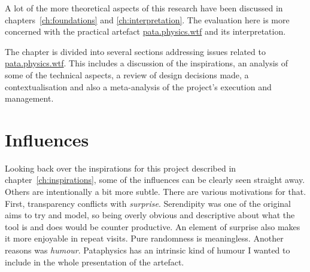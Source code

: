 \spirals

A lot of the more theoretical aspects of this research have been discussed in chapters~\ref{ch:foundations} and \ref{ch:interpretation}. The evaluation here is more concerned with the practical artefact \url{pata.physics.wtf} and its interpretation.

The chapter is divided into several sections addressing issues related to \url{pata.physics.wtf}. This includes a discussion of the inspirations, an analysis of some of the technical aspects, a review of design decisions made, a contextualisation and also a meta-analysis of the project's execution and management.


\section{Influences}

Looking back over the inspirations for this project described in chapter~\ref{ch:inspirations}, some of the influences can be clearly seen straight away. Others are intentionally a bit more subtle. There are various motivations for that. First, transparency conflicts with \emph{surprise}. Serendipity was one of the original aims to try and model, so being overly obvious and descriptive about what the tool is and does would be counter productive. An element of surprise also makes it more enjoyable in repeat visits. Pure randomness is meaningless. Another reasons was \emph{humour}. Pataphysics has an intrinsic kind of humour I wanted to include in the whole presentation of the artefact. 

